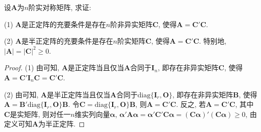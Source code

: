 \documentclass[../../main.tex]{subfiles}
\begin{document}
\begin{proposition}[正定和半正定阵的判定准则之一]\label{proposition:正定和半正定阵的判定准则}
设$\boldsymbol{A}$为$n$阶实对称矩阵, 求证:

(1) $\boldsymbol{A}$是正定阵的充要条件是存在$n$阶非异实矩阵$\boldsymbol{C}$, 使得$\boldsymbol{A}=\boldsymbol{C}'\boldsymbol{C}$.

(2) $\boldsymbol{A}$是半正定阵的充要条件是存在$n$阶实矩阵$\boldsymbol{C}$, 使得$\boldsymbol{A}=\boldsymbol{C}'\boldsymbol{C}$. 特别地, $|\boldsymbol{A}| = |\boldsymbol{C}|^2\geqslant  0$.
\end{proposition}
\begin{proof}
(1) 由可知, $\boldsymbol{A}$是正定阵当且仅当$\boldsymbol{A}$合同于$\boldsymbol{I}_n$, 即存在非异实矩阵$\boldsymbol{C}$, 使得$\boldsymbol{A}=\boldsymbol{C}'\boldsymbol{I}_n\boldsymbol{C}=\boldsymbol{C}'\boldsymbol{C}$.

(2) 由可知, $\boldsymbol{A}$是半正定阵当且仅当$\boldsymbol{A}$合同于$\text{diag}\{\boldsymbol{I}_r, \boldsymbol{O}\}$, 即存在非异实矩阵$\boldsymbol{B}$, 使得$\boldsymbol{A}=\boldsymbol{B}'\text{diag}\{\boldsymbol{I}_r, \boldsymbol{O}\}\boldsymbol{B}$. 令$\boldsymbol{C}=\text{diag}\{\boldsymbol{I}_r, \boldsymbol{O}\}\boldsymbol{B}$, 则$\boldsymbol{A}=\boldsymbol{C}'\boldsymbol{C}$. 反之, 若$\boldsymbol{A}=\boldsymbol{C}'\boldsymbol{C}$, 其中$\boldsymbol{C}$是实矩阵, 则对任一$n$维实列向量$\boldsymbol{\alpha}$, $\boldsymbol{\alpha}'\boldsymbol{A}\boldsymbol{\alpha}=\boldsymbol{\alpha}'\boldsymbol{C}'\boldsymbol{C}\boldsymbol{\alpha}=(\boldsymbol{C}\boldsymbol{\alpha})'(\boldsymbol{C}\boldsymbol{\alpha})\geqslant  0$, 由定义可知$\boldsymbol{A}$为半正定阵.

\end{proof}
\end{document}
